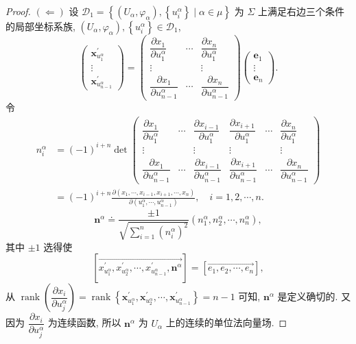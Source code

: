 \begin{proof}
$(\Leftarrow)$ 设 $\mathcal{D}_{1}=\left\{\left(U_{\alpha}, \varphi_{\alpha}\right),\left\{u_{i}^{\alpha}\right\} \mid \alpha \in \mu\right\}$ 为 $\Sigma$ 上满足右边三个条件的局部坐标系族, $\left(U_{\alpha}, \varphi_{\alpha}\right),\left\{u_{i}^{\alpha}\right\} \in \mathcal{D}_{1}$,
\[
  \begin{pmatrix}
    \boldsymbol{x}_{u_{1}^{\alpha}}^{\prime} \\
    \vdots \\
    \boldsymbol{x}_{u_{n-1}^{\alpha}}^{\prime}
  \end{pmatrix}
  =\begin{pmatrix}
    \dfrac{\partial x_{1}}{\partial u_{1}^{\alpha}} & \cdots & \dfrac{\partial x_{n}}{\partial u_{1}^{\alpha}} \\
    \vdots & & \vdots \\
    \dfrac{\partial x_{1}}{\partial u_{n-1}^{\alpha}} & \cdots & \dfrac{\partial x_{n}}{\partial u_{n-1}^{\alpha}}
  \end{pmatrix}
  \begin{pmatrix}
    \boldsymbol{e}_{1} \\
    \vdots \\
    \boldsymbol{e}_{n}
  \end{pmatrix}.
\]
令
\begin{align*}
  n_{i}^{\alpha} &=(-1)^{i+n} \operatorname{det}
    \begin{pmatrix}
      \dfrac{\partial x_{1}}{\partial u_{1}^{\alpha}} & \cdots & \dfrac{\partial x_{i-1}}{\partial u_{1}^{\alpha}} & \dfrac{\partial x_{i+1}}{\partial u_{1}^{\alpha}} & \cdots & \dfrac{\partial x_{n}}{\partial u_{1}^{\alpha}} \\
      \vdots & & \vdots & \vdots & & \vdots \\
      \dfrac{\partial x_{1}}{\partial u_{n-1}^{\alpha}} & \cdots & \dfrac{\partial x_{i-1}}{\partial u_{n-1}^{\alpha}} & \dfrac{\partial x_{i+1}}{\partial u_{n-1}^{\alpha}} & \cdots & \dfrac{\partial x_{n}}{\partial u_{n-1}^{\alpha}}
    \end{pmatrix} \\
  &=(-1)^{i+n} \frac{\partial\left(x_{1}, \cdots, x_{i-1}, x_{i+1}, \cdots, x_{n}\right)}{\partial\left(u_{1}^{\alpha}, \cdots, u_{n-1}^{\alpha}\right)}, \quad i=1,2, \cdots, n.
\end{align*}
\[
  \boldsymbol{n}^{\alpha} \doteq \frac{\pm 1}{\sqrt{\sum_{i=1}^{n}\left(n_{i}^{\alpha}\right)^{2}}}\left(n_{1}^{\alpha}, n_{2}^{\alpha}, \cdots, n_{n}^{\alpha}\right),
\]
其中 $\pm 1$ 选得使
\[
  \left[\overrightarrow{x_{u_{1}^{\alpha}}^{\prime}, x_{u_{2}^{\alpha}}^{\prime}, \cdots, x_{u_{n-1}^{\alpha}}^{\prime}, \boldsymbol{n}^{\alpha}}\right]=\left[\overrightarrow{e_{1}, e_{2}, \cdots, e_{n}}\right],
\]
从 $\operatorname{rank}\left(\dfrac{\partial x_{i}}{\partial u_{j}^{\alpha}}\right)=\operatorname{rank}\left\{\boldsymbol{x}_{u_{1}^{\alpha}}^{\prime}, \boldsymbol{x}_{u_{2}^{\alpha}}^{\prime}, \cdots, \boldsymbol{x}_{u_{n-1}^{\alpha}}^{\prime}\right\}=n-1$ 可知, $\boldsymbol{n}^{\alpha}$ 是定义确切的. 又因为 $\dfrac{\partial x_{i}}{\partial u_{j}^{\alpha}}$ 为连续函数, 所以 $\boldsymbol{n}^{\alpha}$ 为 $U_{\alpha}$ 上的连续的单位法向量场.


\end{proof}
